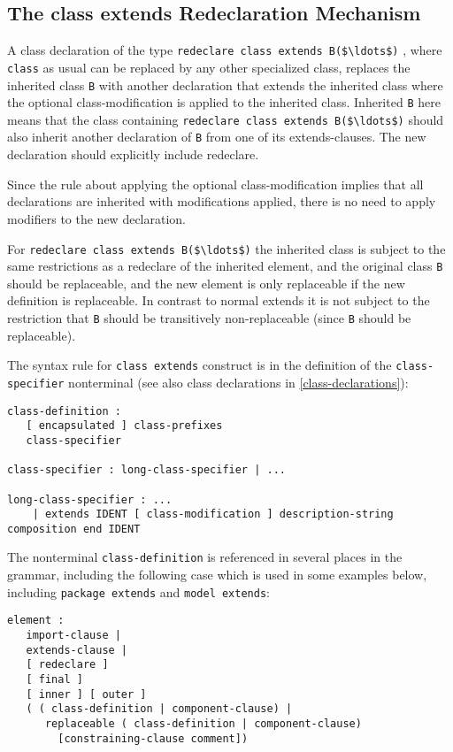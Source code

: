 \subsection{The class extends Redeclaration Mechanism}\label{the-class-extends-redeclaration-mechanism}

A class declaration of the type \lstinline!redeclare class extends B($\ldots$)! ,
where \lstinline!class! as usual can be replaced by any other specialized class,
replaces the inherited class \lstinline!B! with another declaration that extends the
inherited class where the optional class-modification is applied to the
inherited class.  Inherited \lstinline!B! here means that the class
containing \lstinline!redeclare class extends B($\ldots$)! should also inherit
another declaration of \lstinline!B! from one of its extends-clauses. The new
declaration should explicitly include redeclare.

\begin{nonnormative}
Since the rule about applying the optional class-modification implies that all declarations are inherited with modifications applied, there is no need
to apply modifiers to the new declaration.
\end{nonnormative}

For \lstinline!redeclare class extends B($\ldots$)! the inherited class is subject
to the same restrictions as a redeclare of the inherited element, and
the original class \lstinline!B! should be replaceable, and the new element is only
replaceable if the new definition is replaceable. In contrast to normal
extends it is not subject to the restriction that \lstinline!B! should be
transitively non-replaceable (since \lstinline!B! should be replaceable).

The syntax rule for \lstinline!class extends! construct is in the definition of the
\lstinline!class-specifier! nonterminal (see also class declarations in \cref{class-declarations}):
\begin{lstlisting}[language=grammar]
class-definition :
   [ encapsulated ] class-prefixes
   class-specifier

class-specifier : long-class-specifier | ...

long-class-specifier : ...
    | extends IDENT [ class-modification ] description-string composition end IDENT
\end{lstlisting}
The nonterminal \lstinline!class-definition! is referenced in several places in the
grammar, including the following case which is used in some examples
below, including \lstinline!package extends! and \lstinline!model extends!:
\begin{lstlisting}[language=grammar]
element :
   import-clause |
   extends-clause |
   [ redeclare ]
   [ final ]
   [ inner ] [ outer ]
   ( ( class-definition | component-clause) |
      replaceable ( class-definition | component-clause)
        [constraining-clause comment])
\end{lstlisting}

